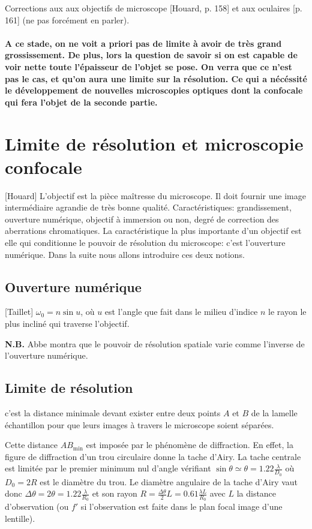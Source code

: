 \documentclass[11pt]{report}
\numberwithin{figure}{section}
\numberwithin{equation}{section}
\numberwithin{table}{section}
\newcommand{\1}{\boldsymbol{1}}
\begin{document}
Corrections aux aux objectifs de microscope [Houard, p. 158] et aux oculaires [p. 161] (ne pas forcément en parler).

\paragraph{A ce stade, on ne voit a priori pas de limite à avoir de très grand grossissement. De plus, lors la
question de savoir si on est capable de voir nette toute l’épaisseur de l’objet se pose. On verra que ce n'est pas le cas, et qu'on aura une limite sur la résolution. Ce qui a nécéssité le développement de nouvelles microscopies optiques dont la confocale qui fera l'objet de la seconde partie.}


\section{Limite de résolution et microscopie confocale}

[Houard] L'objectif est la pièce maîtresse du microscope. Il doit fournir une image intermédiaire agrandie de très bonne qualité. Caractéristiques: grandissement, ouverture numérique, objectif à immersion ou non, degré de correction des aberrations chromatiques. La caractéristique la plus importante d'un objectif est elle qui conditionne le pouvoir de résolution du microscope: c'est l'ouverture numérique. Dans la suite nous allons introduire ces deux notions.


\subsection{Ouverture numérique} [Taillet] $\omega_0 = n \sin u$, où $u$ est l'angle que fait dans le milieu d'indice $n$ le rayon le plus incliné qui traverse l'objectif. 

\textbf{N.B.} Abbe montra que le pouvoir de résolution spatiale varie comme l'inverse de l'ouverture numérique. 

\subsection{Limite de résolution} c'est la distance minimale devant exister entre deux points $A$ et $B$ de la lamelle échantillon pour que leurs images à travers le microscope soient séparées.

Cette distance $AB_{\min}$ est imposée par le phénomène de diffraction. En effet, la figure de diffraction d'un trou circulaire donne la tache d'Airy. La tache centrale est limitée par le premier minimum nul d'angle vérifiant $\sin \theta \simeq \theta = 1.22 \frac{\lambda}{D_0}$ où $D_0 = 2R$ est le diamètre du trou. Le diamètre angulaire de la tache d'Airy vaut donc $\Delta \theta = 2 \theta = 1.22 \frac{\lambda}{R_0}$ et son rayon $R = \frac{\Delta \theta}{2} L = 0.61 \frac{\lambda L}{R_0}$ avec $L$ la distance d'observation (ou $f'$ si l'observation est faite dans le plan focal image d'une lentille).
 
\end{document}
